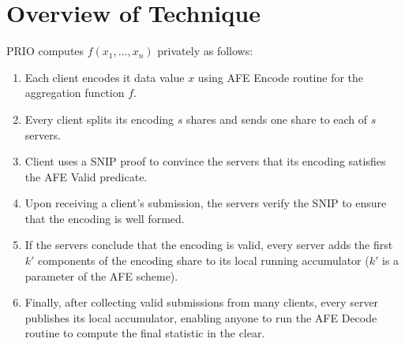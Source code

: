 \section{Overview of Technique}
PRIO computes $f(x_1, ..., x_n)$ privately as follows:
\begin{enumerate}
    \item Each client encodes it data value $x$ using AFE Encode routine for the aggregation function $f$.
    \item Every client splits its encoding $s$ shares and sends one share to each of $s$ servers.
    \item Client uses a SNIP proof to convince the servers that its encoding satisfies the AFE Valid predicate.
    \item Upon receiving a client's submission, the servers verify the SNIP to ensure that the encoding is well formed.
    \item If the servers conclude that the encoding is valid, every server adds the first $k'$ components of the encoding share to its local running accumulator ($k'$ is a parameter of the AFE scheme).
    \item Finally, after collecting valid submissions from many clients, every server publishes its local accumulator, enabling anyone to run the AFE Decode routine to compute the final statistic in the clear.
\end{enumerate}



%
